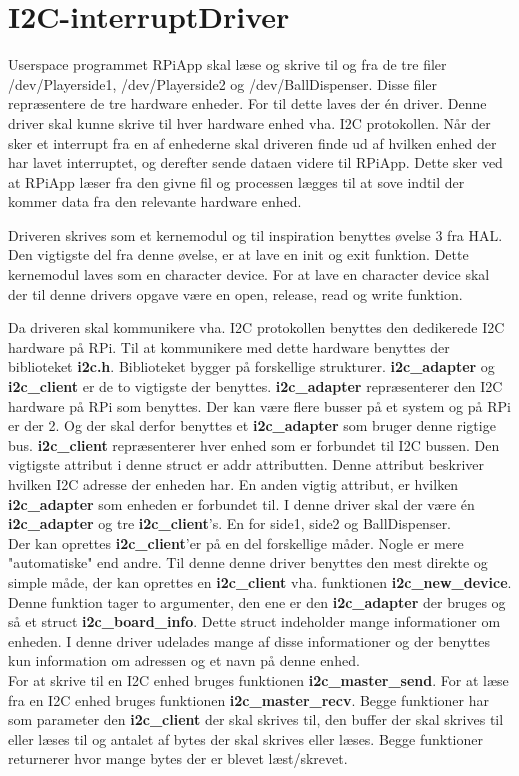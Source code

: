 \documentclass[Softwaredesign/Softwaredesign_main.tex]{subfiles}
\begin{document}
\section{I2C-interruptDriver}
Userspace programmet RPiApp skal læse og skrive til og fra de tre filer /dev/Playerside1, /dev/Playerside2 og /dev/BallDispenser. Disse filer repræsentere de tre hardware enheder. For til dette laves der én driver. Denne driver skal kunne skrive til hver hardware enhed vha. I2C protokollen. Når der sker et interrupt fra en af enhederne skal driveren finde ud af hvilken enhed der har lavet interruptet, og derefter sende dataen videre til RPiApp. Dette sker ved at RPiApp læser fra den givne fil og processen lægges til at sove indtil der kommer data fra den relevante hardware enhed.

Driveren skrives som et kernemodul og til inspiration benyttes øvelse 3 fra HAL. Den vigtigste del fra denne øvelse, er at lave en init og exit funktion. Dette kernemodul laves som en character device. For at lave en character device skal der til denne drivers opgave være en open, release, read og write funktion.

Da driveren skal kommunikere vha. I2C protokollen benyttes den dedikerede I2C hardware på RPi. Til at kommunikere med dette hardware benyttes der biblioteket \textbf{i2c.h}. Biblioteket bygger på forskellige strukturer. \textbf{i2c\_adapter} og\textbf{ i2c\_client} er de to vigtigste der benyttes. 
\textbf{i2c\_adapter} repræsenterer den I2C hardware på RPi som benyttes. Der kan være flere busser på et system og på RPi er der 2. Og der skal derfor benyttes et \textbf{i2c\_adapter} som bruger denne rigtige bus. 
\textbf{i2c\_client} repræsenterer hver enhed som er forbundet til I2C bussen. Den vigtigste attribut i denne struct er addr attributten. Denne attribut beskriver hvilken I2C adresse der enheden har. En anden vigtig attribut, er hvilken \textbf{i2c\_adapter} som enheden er forbundet til.
I denne driver skal der være én \textbf{i2c\_adapter} og tre \textbf{i2c\_client}'s. En for side1, side2 og BallDispenser. \\
Der kan oprettes \textbf{i2c\_client}'er på en del forskellige måder. Nogle er mere "automatiske" end andre. Til denne denne driver benyttes den mest direkte og simple måde, der kan oprettes en \textbf{i2c\_client} vha. funktionen \textbf{i2c\_new\_device}. Denne funktion tager to argumenter, den ene er den \textbf{i2c\_adapter} der bruges og så et struct \textbf{i2c\_board\_info}. Dette struct indeholder mange informationer om enheden. I denne driver udelades mange af disse informationer og der benyttes kun information om adressen og et navn på denne enhed.\\
For at skrive til en I2C enhed bruges funktionen \textbf{i2c\_master\_send}. For at læse fra en I2C enhed bruges funktionen \textbf{i2c\_master\_recv}. Begge funktioner har som parameter den\textbf{ i2c\_client} der skal skrives til, den buffer der skal skrives til eller læses til og antalet af bytes der skal skrives eller læses. Begge funktioner returnerer hvor mange bytes der er blevet læst/skrevet.
\end{document}
